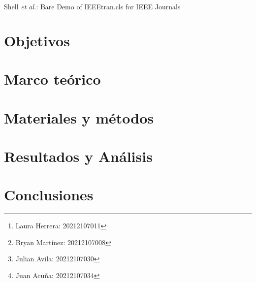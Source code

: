 \documentclass[journal, table]{IEEEtran}
\begin{document}
\title{}

\author[*]{Laura Herrera
    \thanks{Laura Herrera: 20212107011}}
\author[*]{Bryan Martínez
    \thanks{Bryan Martínez: 20212107008}}
\author[*]{Julian Avila
    \thanks{Julian Avila: 20212107030}}
\author[*]{Juan Acuña
    \thanks{Juan Acuña: 20212107034}}



\markboth{}
{Shell \MakeLowercase{\textit{et al.}}: Bare Demo of IEEEtran.cls for IEEE Journals}

\maketitle



\section{Objetivos}


\section{Marco teórico}


\section{Materiales y métodos}


\section{Resultados y Análisis}


\section{Conclusiones}


\printbibliography
\nocite{*}
\end{document}
